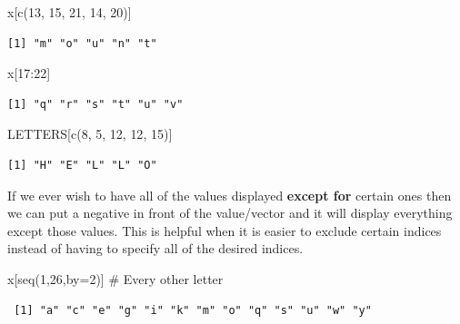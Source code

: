 \documentclass[
  letterpaper,
  DIV=11,
  numbers=noendperiod]{scrreprt}
\newenvironment{Shaded}{\begin{snugshade}}{\end{snugshade}}
\newcommand{\AttributeTok}[1]{\textcolor[rgb]{0.40,0.45,0.13}{#1}}
\newcommand{\CommentTok}[1]{\textcolor[rgb]{0.37,0.37,0.37}{#1}}
\newcommand{\DecValTok}[1]{\textcolor[rgb]{0.68,0.00,0.00}{#1}}
\newcommand{\FunctionTok}[1]{\textcolor[rgb]{0.28,0.35,0.67}{#1}}
\newcommand{\NormalTok}[1]{\textcolor[rgb]{0.00,0.23,0.31}{#1}}
\newcommand{\SpecialCharTok}[1]{\textcolor[rgb]{0.37,0.37,0.37}{#1}}
\begin{document}
\begin{Shaded}
\begin{Highlighting}[]
\NormalTok{x[}\FunctionTok{c}\NormalTok{(}\DecValTok{13}\NormalTok{, }\DecValTok{15}\NormalTok{, }\DecValTok{21}\NormalTok{, }\DecValTok{14}\NormalTok{, }\DecValTok{20}\NormalTok{)]}
\end{Highlighting}
\end{Shaded}

\begin{verbatim}
[1] "m" "o" "u" "n" "t"
\end{verbatim}

\begin{Shaded}
\begin{Highlighting}[]
\NormalTok{x[}\DecValTok{17}\SpecialCharTok{:}\DecValTok{22}\NormalTok{]}
\end{Highlighting}
\end{Shaded}

\begin{verbatim}
[1] "q" "r" "s" "t" "u" "v"
\end{verbatim}

\begin{Shaded}
\begin{Highlighting}[]
\NormalTok{LETTERS[}\FunctionTok{c}\NormalTok{(}\DecValTok{8}\NormalTok{, }\DecValTok{5}\NormalTok{, }\DecValTok{12}\NormalTok{, }\DecValTok{12}\NormalTok{, }\DecValTok{15}\NormalTok{)]}
\end{Highlighting}
\end{Shaded}

\begin{verbatim}
[1] "H" "E" "L" "L" "O"
\end{verbatim}

If we ever wish to have all of the values displayed \textbf{except for}
certain ones then we can put a negative in front of the value/vector and
it will display everything except those values. This is helpful when it
is easier to exclude certain indices instead of having to specify all of
the desired indices.

\begin{Shaded}
\begin{Highlighting}[]
\NormalTok{x[}\FunctionTok{seq}\NormalTok{(}\DecValTok{1}\NormalTok{,}\DecValTok{26}\NormalTok{,}\AttributeTok{by=}\DecValTok{2}\NormalTok{)] }\CommentTok{\# Every other letter}
\end{Highlighting}
\end{Shaded}

\begin{verbatim}
 [1] "a" "c" "e" "g" "i" "k" "m" "o" "q" "s" "u" "w" "y"
\end{verbatim}
\end{document}
